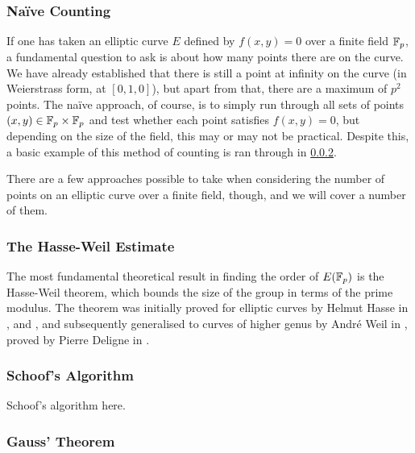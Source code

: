 \subsubsection{Naïve Counting}
If one has taken an elliptic curve $E$ defined by $f(x,y)=0$ over a finite field $\mathbb{F}_{p}$, a fundamental question to ask is about how many points there are on the curve.
We have already established that there is still a point at infinity on the curve (in Weierstrass form, at $[0,1,0]$), but apart from that, there are a maximum of $p^2$ points. %
The naïve approach, of course, is to simply run through all sets of points $(x,y) \in \mathbb{F}_{p} \times \mathbb{F}_{p}$ and test whether each point satisfies $f(x,y)=0$, but depending on the size of the field, this may or may not be practical.
Despite this, a basic example of this method of counting is ran through in \cref{hasseweil}.

There are a few approaches possible to take when considering the number of points on an elliptic curve over a finite field, though, and we will cover a number of them.
\subsubsection{The Hasse-Weil Estimate}
\label{hasseweil}
The most fundamental theoretical result in finding the order of $E(\mathbb{F}_{p})$ is the Hasse-Weil theorem, which bounds the size of the group in terms of the prime modulus.
The theorem was initially proved for elliptic curves by Helmut Hasse in \cite{hasse1936a}, \cite{hasse1936b} and \cite{hasse1936c}, and subsequently generalised to curves of higher genus by André Weil in \cite{weil1948}, proved by Pierre Deligne in \cite{deligne1974}.

\subsubsection{Schoof's Algorithm}
Schoof's algorithm here.
\subsubsection{Gauss' Theorem}

